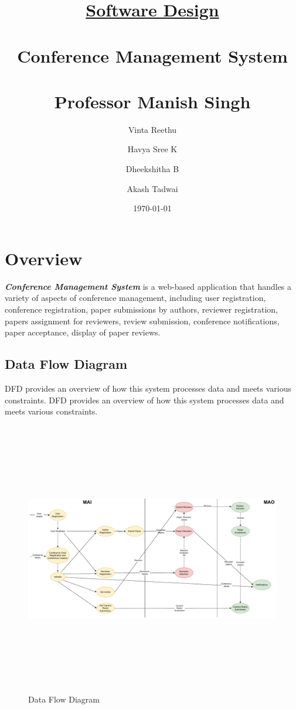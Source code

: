 \documentclass[english,a4paper,12pt]{report}
\title{\textbf{\underline{\Huge{Software Design}}}\\~\\
\textbf{Conference Management System}\\~\\ 
Professor Manish Singh\\
}
\author{Vinta Reethu \and Havya Sree K \and Dheekshitha B \and Akash Tadwai }
\date{\today}
\begin{document}
\titleformat{\chapter}[display]   
{\normalfont\huge\bfseries}{\chaptertitlename\ \thechapter}{20pt}{\Huge}   
\titlespacing*{\chapter}{0pt}{-10pt}{40pt}
\maketitle
\tableofcontents
\newpage

\chapter{Overview}
\textbf{\textit{Conference Management System}} is a web-based application that handles a variety of aspects of conference management, including user registration, conference registration, paper submissions by authors, reviewer registration, papers assignment for reviewers, review submission, conference notifications, paper acceptance, display of paper reviews. 

\section{Data Flow Diagram}
DFD provides an overview of how this system processes  data and meets various constraints.  DFD provides an overview of how this system processes  data and meets various constraints.

\begin{figure}[h!]
\centering
 \includegraphics[keepaspectratio,width=18cm,height=12cm]{SD-Images/DFD.pdf}
\caption{Data Flow Diagram}
\end{figure}
\end{document}
